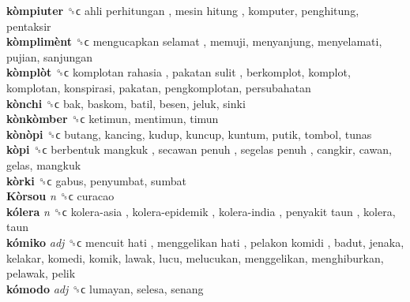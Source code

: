 \textbf{kòmpiuter} ␝ϲ   ahli perhitungan ,  mesin hitung , komputer, penghitung, pentaksir  \\
\textbf{kòmplimènt} ␝ϲ   mengucapkan selamat , memuji, menyanjung, menyelamati, pujian, sanjungan  \\
\textbf{kòmplòt} ␝ϲ   komplotan rahasia ,  pakatan sulit , berkomplot, komplot, komplotan, konspirasi, pakatan, pengkomplotan, persubahatan  \\
\textbf{kònchi} ␝ϲ  bak, baskom, batil, besen, jeluk, sinki  \\
\textbf{kònkòmber} ␝ϲ  ketimun, mentimun, timun  \\
\textbf{kònòpi} ␝ϲ  butang, kancing, kudup, kuncup, kuntum, putik, tombol, tunas  \\
\textbf{kòpi} ␝ϲ   berbentuk mangkuk ,  secawan penuh ,  segelas penuh , cangkir, cawan, gelas, mangkuk  \\
\textbf{kòrki} ␝ϲ  gabus, penyumbat, sumbat  \\
\textbf{Kòrsou} \emph{n}  ␝ϲ  curacao  \\
\textbf{kólera} \emph{n}  ␝ϲ   kolera-asia ,  kolera-epidemik ,  kolera-india ,  penyakit taun , kolera, taun  \\
\textbf{kómiko} \emph{adj}  ␝ϲ   mencuit hati ,  menggelikan hati ,  pelakon komidi , badut, jenaka, kelakar, komedi, komik, lawak, lucu, melucukan, menggelikan, menghiburkan, pelawak, pelik  \\
\textbf{kómodo} \emph{adj}  ␝ϲ  lumayan, selesa, senang  \\
